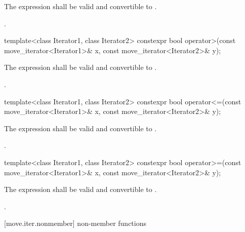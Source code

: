 \begin{itemdescr}
{\color{newclr}
\pnum
\constraints
The expression  shall be valid and
convertible to .
} %

\pnum
\returns {}.
\end{itemdescr}

%
\begin{itemdecl}
template<class Iterator1, class Iterator2>
constexpr bool operator>(const move_iterator<Iterator1>& x, const move_iterator<Iterator2>& y);
\end{itemdecl}

\begin{itemdescr}
{\color{newclr}
\pnum
\constraints
The expression  shall be valid and
convertible to .
} %

\pnum
\returns {}.
\end{itemdescr}

%
\begin{itemdecl}
template<class Iterator1, class Iterator2>
constexpr bool operator<=(const move_iterator<Iterator1>& x, const move_iterator<Iterator2>& y);
\end{itemdecl}

\begin{itemdescr}
{\color{newclr}
\pnum
\constraints
The expression  shall be valid and
convertible to .
} %

\pnum
\returns {}.
\end{itemdescr}

%
\begin{itemdecl}
template<class Iterator1, class Iterator2>
constexpr bool operator>=(const move_iterator<Iterator1>& x, const move_iterator<Iterator2>& y);
\end{itemdecl}

\begin{itemdescr}
{\color{newclr}
\pnum
\constraints
The expression  shall be valid and
convertible to .
} %

\pnum
\returns {}.
\end{itemdescr}

[move.iter.nonmember]{ non-member functions}

